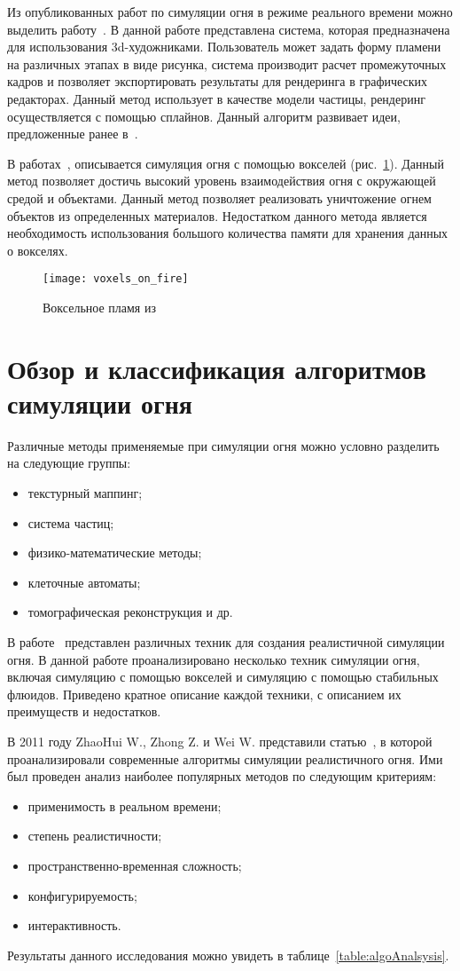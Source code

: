 Из опубликованных работ по симуляции огня в режиме реального времени можно
выделить работу~\cite{turbulence}. В данной работе представлена система, которая
предназначена для использования 3d-художниками. Пользователь может задать форму
пламени на различных этапах в виде рисунка, система производит расчет
промежуточных кадров и позволяет экспортировать результаты для рендеринга в
графических редакторах. Данный метод использует в качестве модели частицы,
рендеринг осуществляется с помощью сплайнов. Данный алгоритм развивает идеи,
предложенные ранее в~\cite{Vanzine2007RealisticRR}.

В работах~\cite{Zhao2003VoxelsOF}, описывается симуляция огня с помощью вокселей
(рис.~\ref{fig:voxelFire}). Данный метод позволяет достичь высокий уровень
взаимодействия огня с окружающей средой и объектами. Данный метод позволяет
реализовать уничтожение огнем объектов из определенных материалов. Недостатком
данного метода является необходимость использования большого количества памяти
для хранения данных о вокселях.
\begin{figure}[htb]
	\centering
	\texttt{[image: voxels\_on\_fire]}
    \caption{Воксельное пламя из~\cite{Zhao2003VoxelsOF}}%
    \label{fig:voxelFire}
\end{figure}

\section{Обзор и классификация алгоритмов симуляции огня}

Различные методы применяемые при симуляции огня можно условно разделить на
следующие группы:
\begin{itemize}
	\item текстурный маппинг;
	\item система частиц;
	\item физико-математические методы;
	\item клеточные автоматы;
	\item томографическая реконструкция и др.
\end{itemize}

В работе~\cite{realistic_sim} представлен различных техник для создания
реалистичной симуляции огня. В данной работе проанализировано несколько техник
симуляции огня, включая симуляцию с помощью вокселей и симуляцию с помощью
стабильных флюидов. Приведено кратное описание каждой техники, с описанием их
преимуществ и недостатков.

В 2011 году ZhaoHui W., Zhong Z. и Wei W. представили статью~\cite{survey}, в
которой проанализировали современные алгоритмы симуляции реалистичного огня. Ими
был проведен анализ наиболее популярных методов по следующим критериям:
\begin{itemize}
	\item применимость в реальном времени;
	\item степень реалистичности;
	\item пространственно-временная сложность;
	\item конфигурируемость;
	\item интерактивность.
\end{itemize}
Результаты данного исследования можно увидеть в таблице~\ref{table:algoAnalsysis}.

